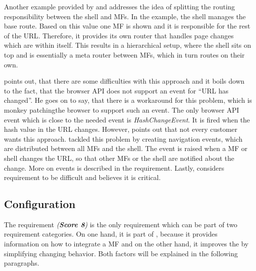 Another example provided by \textciteRehm{} and \textciteSteyer{} addresses the idea of splitting the routing responsibility between the shell and \acp{MF}.
In the example, the shell manages the base route.
Based on this value one \ac{MF} is shown and it is responsible for the rest of the \ac{URL}.
Therefore, it provides its own router that handles page changes which are within itself.
This results in a hierarchical setup, where the shell sits on top and is essentially a meta router between \acp{MF}, which in turn routes on their own.

\textciteSteyer{} points out, that there are some difficulties with this approach and it boils down to the fact, that the browser \ac{API} does not support an event for \enquote{\ac{URL} has changed}.
He goes on to say, that there is a workaround for this problem, which is monkey patching\footnotemark the browser to support such an event.
The only browser \ac{API} event which is close to the needed event is \textit{HashChangeEvent}\footnotemark{}.
It is fired when the hash value in the \ac{URL} changes.
However, \citeauthorSteyer{} points out that not every customer wants this approach.
\textciteRehm{} tackled this problem by creating navigation events, which are distributed between all \acp{MF} and the shell.
The event is raised when a \ac{MF} or shell changes the \ac{URL}, so that other \acp{MF} or the shell are notified about the change.
More on events is described in the \textit{} requirement.
Lastly,  \textciteJovanovic{} considers \textit{} requirement to be difficult and \citeauthorSteyer{} believes it is critical.





\subsection{Configuration}\label{cha:requirement_detail_integration_configuration}

The requirement \textit{ (\textbf{Score 8})} is the only requirement which can be part of two requirement categories.
On one hand, it is part of \textit{}, because it provides information on how to integrate a \ac{MF} and on the other hand, it improves the \textit{} by simplifying changing behavior.
Both factors will be explained in the following paragraphs.

